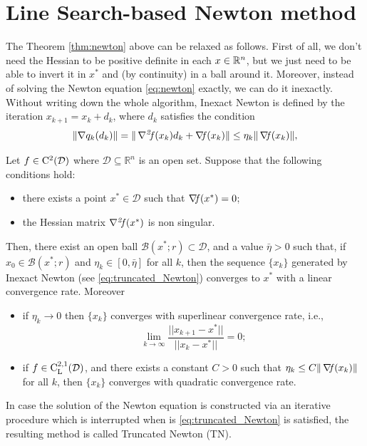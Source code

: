 \documentclass[10pt,a4paper]{article}
\begin{document}
\section{Line Search-based Newton method}
The Theorem \ref{thm:newton} above can be relaxed as follows. First of all, we don't need the Hessian to be positive definite in each $x\in \mathbb{R}^n$, but we just need to be able to invert it in $x^*$ and (by continuity) in a ball around it. Moreover, instead of solving the Newton equation \eqref{eq:newton} exactly, we can do it inexactly. Without writing down the whole algorithm, Inexact Newton is defined by the iteration $x_{k+1} = x_k + d_k$, where $d_k$ satisfies the condition
\begin{equation}\label{eq:truncated_Newton}
	\| \nabla q_k(d_k)\|=\|\operatorname*{\mathit{\nabla^2 \!f}}(x_k) d_k + \operatorname*{\mathit{\nabla \!f}}(x_k)\| \leq \eta_k \|\operatorname*{\mathit{\nabla \!f}}(x_k)\|,
\end{equation}
\begin{proposition}\label{inexact_newton}
	Let $f\in \mathord{\mathrm{C^2}}(\mathcal{D})$ where $\mathcal{D} \subseteq \mathbb{R}^n$ is an open set. Suppose that the following conditions hold:
	\begin{itemize}
		\item[(i)] there exists a point $x^* \in \mathcal{D}$ such that $\operatorname*{\mathit{\nabla \!f}}(x^*) = 0$;
		\item[(ii)] the Hessian matrix $\operatorname*{\mathit{\nabla^2 \!f}}(x^*)$ is non singular.
	\end{itemize}
	Then, there exist an open ball $\mathcal{B}(x^*; r) \subset \mathcal{D}$, and a value $\bar{\eta}>0$ such that, if $x_0 \in \mathcal{B}(x^*; r)$ and $\eta_k \in [0, \bar{\eta}]$ for all $k$, then the sequence $\{x_k\}$ generated by Inexact Newton (see \eqref{eq:truncated_Newton})	converges to $x^*$ with a linear convergence rate. Moreover 
	\begin{itemize}
		\item[(a)] if $\eta_k \to 0$ then $\{x_k\}$ converges with superlinear convergence rate, i.e., 
		$$ \lim_{k\to \infty} \frac{||x_{k+1}-x^*||}{||x_k-x^*||}=0;$$
		\item[(b)] if $f\in \mathord{\mathrm{C^{2,1}_{L}}}(\mathcal{D})$, and there exists a constant $C > 0$ such that $\eta_k \leq C \|\operatorname*{\mathit{\nabla \!f}}(x_k)\|$ for all $k$, then $\{x_k\}$ converges with quadratic convergence rate.
	\end{itemize}
\end{proposition}

\noindent In case the solution of the Newton equation is constructed via an iterative procedure which is  interrupted when is \eqref{eq:truncated_Newton} is satisfied, the resulting method is called Truncated Newton (TN).
\end{document}
